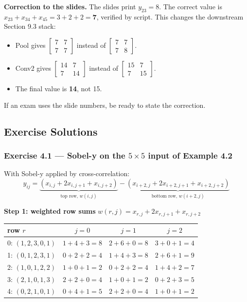 \textbf{Correction to the slides.} The slides print $y_{23} = 8$. The correct value is $x_{23} + x_{34} + x_{45} = 3+2+2 = \mathbf{7}$, verified by script. This changes the downstream Section 9.3 stack:
\begin{itemize}[nosep]
  \item Pool gives $\begin{bmatrix}7&7\\7&7\end{bmatrix}$ instead of $\begin{bmatrix}7&7\\7&8\end{bmatrix}$.
  \item Conv2 gives $\begin{bmatrix}14&7\\7&14\end{bmatrix}$ instead of $\begin{bmatrix}15&7\\7&15\end{bmatrix}$.
  \item The final value is \textbf{14}, not 15.
\end{itemize}
If an exam uses the slide numbers, be ready to state the correction.

\subsection*{Exercise Solutions}

\subsubsection*{Exercise 4.1 --- Sobel-y on the $5\times5$ input of Example 4.2}

With Sobel-y applied by cross-correlation:
\[
y_{ij} = \underbrace{(x_{i,j} + 2x_{i,j+1} + x_{i,j+2})}_{\text{top row, } w(i,j)} - \underbrace{(x_{i+2,j} + 2x_{i+2,j+1} + x_{i+2,j+2})}_{\text{bottom row, } w(i+2,j)}
\]

\textbf{Step 1: weighted row sums} $w(r,j) = x_{r,j} + 2x_{r,j+1} + x_{r,j+2}$

\begin{center}
\begin{tabular}{lccc}
\toprule
row $r$ & $j=0$ & $j=1$ & $j=2$ \\
\midrule
0: $(1,2,3,0,1)$ & $1+4+3=8$ & $2+6+0=8$ & $3+0+1=4$ \\
1: $(0,1,2,3,1)$ & $0+2+2=4$ & $1+4+3=8$ & $2+6+1=9$ \\
2: $(1,0,1,2,2)$ & $1+0+1=2$ & $0+2+2=4$ & $1+4+2=7$ \\
3: $(2,1,0,1,3)$ & $2+2+0=4$ & $1+0+1=2$ & $0+2+3=5$ \\
4: $(0,2,1,0,1)$ & $0+4+1=5$ & $2+2+0=4$ & $1+0+1=2$ \\
\bottomrule
\end{tabular}
\end{center}

